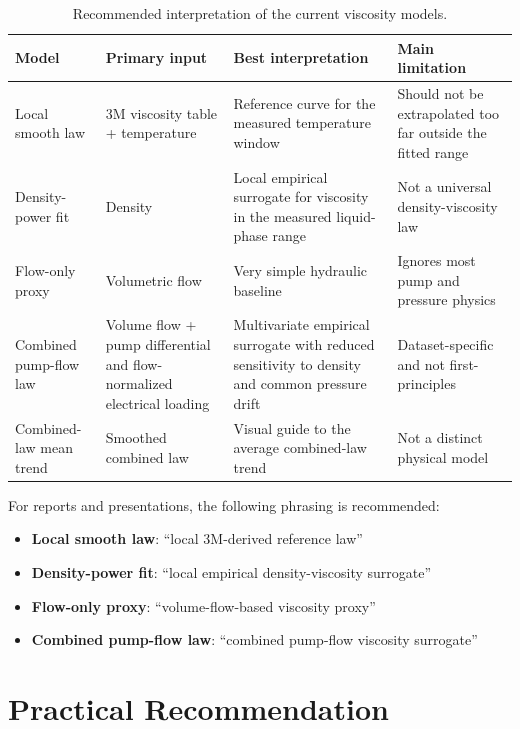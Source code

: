 \documentclass[11pt]{article}
\begin{document}
\begin{table}[h]
    \centering
    \begin{tabular}{>{\raggedright\arraybackslash}p{3.1cm} >{\raggedright\arraybackslash}p{3.1cm} >{\raggedright\arraybackslash}p{4.1cm} >{\raggedright\arraybackslash}p{4.3cm}}
        \toprule
        Model & Primary input & Best interpretation & Main limitation \\
        \midrule
        Local smooth law & 3M viscosity table + temperature & Reference curve for the measured temperature window & Should not be extrapolated too far outside the fitted range \\
        Density-power fit & Density & Local empirical surrogate for viscosity in the measured liquid-phase range & Not a universal density-viscosity law \\
        Flow-only proxy & Volumetric flow & Very simple hydraulic baseline & Ignores most pump and pressure physics \\
        Combined pump-flow law & Volume flow + pump differential and flow-normalized electrical loading & Multivariate empirical surrogate with reduced sensitivity to density and common pressure drift & Dataset-specific and not first-principles \\
        Combined-law mean trend & Smoothed combined law & Visual guide to the average combined-law trend & Not a distinct physical model \\
        \bottomrule
    \end{tabular}
    \caption{Recommended interpretation of the current viscosity models.}
    \label{tab:summary}
\end{table}

For reports and presentations, the following phrasing is recommended:
\begin{itemize}
    \item \textbf{Local smooth law}: ``local 3M-derived reference law''
    \item \textbf{Density-power fit}: ``local empirical density-viscosity surrogate''
    \item \textbf{Flow-only proxy}: ``volume-flow-based viscosity proxy''
    \item \textbf{Combined pump-flow law}: ``combined pump-flow viscosity surrogate''
\end{itemize}

\section{Practical Recommendation}
\end{document}

